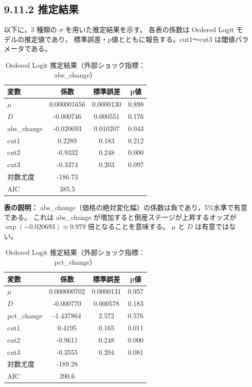 \subsection*{9.11.2 推定結果}

以下に，3 種類の $\sigma$ を用いた推定結果を示す。
各表の係数は Ordered Logit モデルの推定値であり，
標準誤差・p値とともに報告する。cut1～cut3 は閾値パラメータである。


\begin{table}[H]
\centering
\caption{Ordered Logit 推定結果（外部ショック指標：abs\_change）}
\begin{tabular}{lccc}
\hline
変数 & 係数 & 標準誤差 & p値 \\
\hline
$\mu$ & 0.000001656 & 0.0000130 & 0.898 \\
$D$ & -0.000746 & 0.000551 & 0.176 \\
abs\_change & -0.020693 & 0.010207 & 0.043 \\
\hline
cut1 & 0.2289 & 0.183 & 0.212 \\
cut2 & -0.9332 & 0.248 & 0.000 \\
cut3 & -0.3374 & 0.203 & 0.097 \\
\hline
対数尤度 & -186.73 & & \\
AIC & 385.5 & & \\
\hline
\end{tabular}
\end{table}

\noindent
{\small
\textbf{表の説明：}  
abs\_change（価格の絶対変化幅）の係数は負であり，5\%水準で有意である。
これは abs\_change が増加すると倒産ステージが上昇するオッズが
$\exp(-0.020693)\approx 0.979$ 倍となることを意味する。
$\mu$ と $D$ は有意ではない。
}

\vspace{1em}


\begin{table}[H]
\centering
\caption{Ordered Logit 推定結果（外部ショック指標：pct\_change）}
\begin{tabular}{lccc}
\hline
変数 & 係数 & 標準誤差 & p値 \\
\hline
$\mu$ & 0.000000702 & 0.0000131 & 0.957 \\
$D$ & -0.000770 & 0.000578 & 0.183 \\
pct\_change & -1.437864 & 2.572 & 0.576 \\
\hline
cut1 & 0.4195 & 0.165 & 0.011 \\
cut2 & -0.9611 & 0.248 & 0.000 \\
cut3 & -0.3555 & 0.204 & 0.081 \\
\hline
対数尤度 & -189.28 & & \\
AIC & 390.6 & & \\
\hline
\end{tabular}
\end{table}

